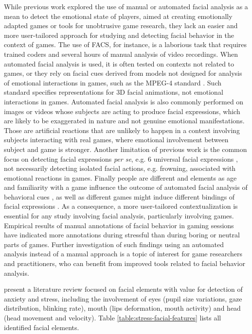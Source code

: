 While previous work explored the use of manual or automated facial analysis as a mean to detect the emotional state of players, aimed at creating emotionally adapted games \parencite{saari2004towards} or tools for unobtrusive game research, they lack an easier and more user-tailored approach for studying and detecting facial behavior in the context of games. The use of FACS, for instance, is a laborious task that requires trained coders and several hours of manual analysis of video recordings. When automated facial analysis is used, it is often tested on contexts not related to games, or they rely on facial cues derived from models not designed for analysis of emotional interactions in games, such as the MPEG-4 standard \parencite{abrantes1999mpeg}. Such standard specifies representations for 3D facial animations, not emotional interactions in games. Automated facial analysis is also commonly performed on images or videos whose subjects are acting to produce facial expressions, which are likely to be exaggerated in nature and not genuine emotional manifestations. Those are artificial reactions that are unlikely to happen in a context involving subjects interacting with real games, where emotional involvement between subject and game is stronger. Another limitation of previous work is the common focus on detecting facial expressions \textit{per se}, e.g. 6 universal facial expressions \parencite{ekman1971constants}, not necessarily detecting isolated facial actions, e.g. frowning, associated with emotional reactions in games. Finally people are different and elements as age and familiarity with a game influence the outcome of automated facial analysis of behavioral cues \parencite{asteriadis2012towards}, as well as different games might induce different bindings of facial expressions \parencite{tan2014correlation}. As a consequence, a more user-tailored contextualization is essential for any study involving facial analysis, particularly involving games. Empirical results of manual annotations of facial behavior in gaming sessions have indicated more annotations during stressful than during boring \parencite{bevilacqua2016variations} or neutral \parencite{kaiser1994multi} parts of games. Further investigation of such findings using an automated analysis instead of a manual approach is a topic of interest for game researchers and practitioners, who can benefit from improved tools related to facial behavior analysis.

\textcite{giannakakis2017stress} present a literature review focused on facial elements with value for detection of anxiety and stress, including the involvement of eyes (pupil size variations, gaze distribution, blinking rate), mouth (lips deformation, mouth activity) and head (head movement and velocity). Table \ref{table:stress-facial-features} lists all identified facial elements.

